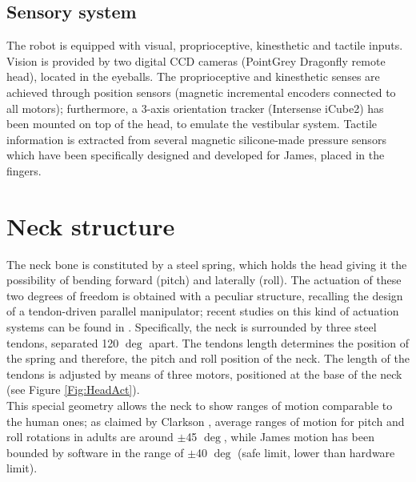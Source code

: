 \documentclass[conference]{IEEEtran}
\numberwithin{equation}{section}
\begin{document}
\subsection{Sensory system}

The robot is equipped with visual, proprioceptive, kinesthetic and tactile inputs. Vision is provided by two digital CCD cameras (PointGrey Dragonfly remote head), located in the eyeballs. The proprioceptive and kinesthetic senses are achieved through position sensors (magnetic incremental encoders connected to all motors); furthermore, a 3-axis orientation tracker (Intersense iCube2) has been mounted on top of the head, to emulate the vestibular system. Tactile information is extracted from several magnetic silicone-made pressure sensors which have been specifically designed and developed for James, placed in the fingers.

\section{Neck structure} \label{Sec:NeckStructure}

The neck bone is constituted by a steel spring, which holds the head giving it the possibility of bending forward (pitch) and laterally (roll). The actuation of these two degrees of freedom is obtained with a peculiar structure, recalling the design of a tendon-driven parallel manipulator; recent studies on this kind of actuation systems can be found in \cite{Verhoeven00parallel,Hay05parallel}. Specifically, the neck is surrounded by three steel tendons, separated 120 $\deg$ apart. The tendons length determines the position of the spring and therefore, the pitch and roll position of the neck. The length of the tendons is adjusted by means of three motors, positioned at the base of the neck (see Figure \ref{Fig:HeadAct}).\\This special geometry allows the neck to show ranges of motion comparable to the human ones; as claimed by Clarkson \cite{Clarkson00skeleton}, average ranges of motion for pitch and roll rotations in adults are around $\pm$45 $\deg$, while James motion has been bounded by software in the range of $\pm$40 $\deg$ (safe limit, lower than hardware limit).
\end{document}
